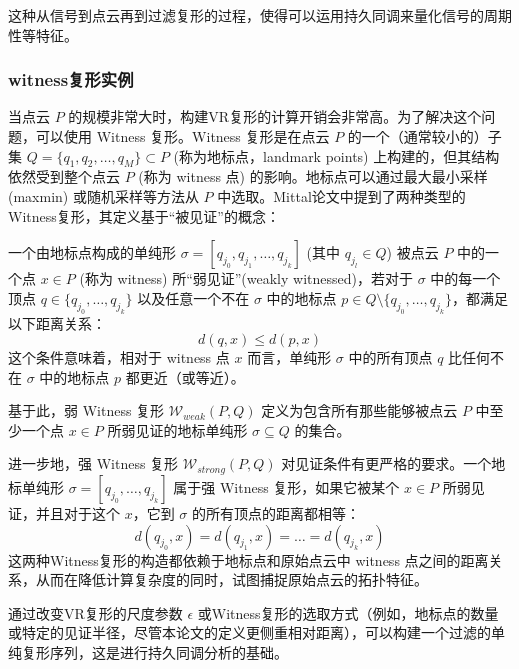 这种从信号到点云再到过滤复形的过程，使得可以运用持久同调来量化信号的周期性等特征。


\subsubsection{witness复形实例}
当点云 $P$ 的规模非常大时，构建VR复形的计算开销会非常高。为了解决这个问题，可以使用 Witness 复形\cite{de2004topological}。Witness 复形是在点云 $P$ 的一个（通常较小的）子集 $Q = \{q_1, q_2, \ldots, q_M\} \subset P$ (称为地标点，landmark points) 上构建的，但其结构依然受到整个点云 $P$ (称为 witness 点) 的影响。地标点可以通过最大最小采样 (maxmin) 或随机采样等方法从 $P$ 中选取。Mittal\cite{mittal2017topological}论文中提到了两种类型的Witness复形，其定义基于“被见证”的概念：

一个由地标点构成的单纯形 $\sigma = [q_{j_0}, q_{j_1}, \ldots, q_{j_k}]$ (其中 $q_{j_l} \in Q$) 被点云 $P$ 中的一个点 $x \in P$ (称为 witness) 所“弱见证”(weakly witnessed)，若对于 $\sigma$ 中的每一个顶点 $q \in \{q_{j_0}, \ldots, q_{j_k}\}$ 以及任意一个不在 $\sigma$ 中的地标点 $p \in Q \setminus \{q_{j_0}, \ldots, q_{j_k}\}$，都满足以下距离关系：
\begin{equation}
    d(q, x) \le d(p, x)
\end{equation}
这个条件意味着，相对于 witness 点 $x$ 而言，单纯形 $\sigma$ 中的所有顶点 $q$ 比任何不在 $\sigma$ 中的地标点 $p$ 都更近（或等近）。

基于此，弱 Witness 复形 $\mathcal{W}_{weak}(P, Q)$ 定义为包含所有那些能够被点云 $P$ 中至少一个点 $x \in P$ 所弱见证的地标单纯形 $\sigma \subseteq Q$ 的集合。

进一步地，强 Witness 复形 $\mathcal{W}_{strong}(P, Q)$ 对见证条件有更严格的要求。一个地标单纯形 $\sigma = [q_{j_0}, \ldots, q_{j_k}]$ 属于强 Witness 复形，如果它被某个 $x \in P$ 所弱见证，并且对于这个 $x$，它到 $\sigma$ 的所有顶点的距离都相等：
\begin{equation}
    d(q_{j_0}, x) = d(q_{j_1}, x) = \ldots = d(q_{j_k}, x)
\end{equation}
这两种Witness复形的构造都依赖于地标点和原始点云中 witness 点之间的距离关系，从而在降低计算复杂度的同时，试图捕捉原始点云的拓扑特征。

通过改变VR复形的尺度参数 $\epsilon$ 或Witness复形的选取方式（例如，地标点的数量或特定的见证半径，尽管本论文的定义更侧重相对距离），可以构建一个过滤的单纯复形序列，这是进行持久同调分析的基础。

